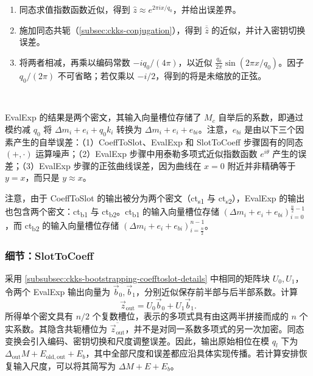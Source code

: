 \begin{enumerate}
\item 同态求值指数函数近似，得到 $\widehat z\approx e^{2\pi ix/q_0}$，并给出误差界。

\item 施加同态共轭（\autoref{subsec:ckks-conjugation}），得到 $\overline{\widehat z}$ 的近似，并计入密钥切换误差。

\item 将两者相减，再乘以编码常数 $-iq_0/(4\pi)$，以近似 $\frac{q_0}{2\pi}\sin(2\pi x/q_0)$。因子 $q_0/(2\pi)$ 不可省略；若仅乘以 $-i/2$，得到的将是未缩放的正弦。
\end{enumerate}

$ $

\textsf{EvalExp} 的结果是两个密文，其输入向量槽位存储了 $M_c$ 自举后的系数，即通过模约减 $q_0$ 将 $\Delta m_i + e_i + q_0k_i$ 转换为 $\Delta m_i + e_i + e_{bi}$。注意，$e_{bi}$ 是由以下三个因素产生的自举误差：（1）\textsf{CoeffToSlot}、\textsf{EvalExp} 和 \textsf{SlotToCoeff} 步骤固有的同态 $(+, \cdot)$ 运算噪声；（2）\textsf{EvalExp} 步骤中用泰勒多项式近似指数函数 $e^{i\theta}$ 产生的误差；（3）\textsf{EvalExp} 步骤的正弦曲线误差，因为曲线在 $x=0$ 附近并非精确等于 $y=x$，而只是 $y \approx x$。

注意，由于 \textsf{CoeffToSlot} 的输出被分为两个密文（\textsf{ct\textsubscript{s1}} 与 \textsf{ct\textsubscript{s2}}），\textsf{EvalExp} 的输出也包含两个密文：\textsf{ct\textsubscript{b1}} 与 \textsf{ct\textsubscript{b2}}。\textsf{ct\textsubscript{b1}} 的输入向量槽位存储 $(\Delta m_i + e_i + e_{bi})_{i=0}^{\frac{n}{2} - 1}$，而 \textsf{ct\textsubscript{b2}} 的输入向量槽位存储 $(\Delta m_i + e_i + e_{bi})_{i=\frac{n}{2}}^{n - 1}$。


\subsubsection{细节：\textsf{SlotToCoeff}}
\label{subsubsec:ckks-bootstrapping-slottocoeff-details}

采用 \autoref{subsubsec:ckks-bootstrapping-coefftoslot-details} 中相同的矩阵块 $U_0,U_1$，令两个 EvalExp 输出向量为 $\vec b_0,\vec b_1$，分别近似保存前半部与后半部系数。计算
\[
\vec z_{\mathrm{out}}=U_0\vec b_0+U_1\vec b_1.
\]
所得单个密文具有 $n/2$ 个复数槽位，表示的多项式具有由这两半拼接而成的 $n$ 个实系数。其隐含共轭槽位为 $\overline{\vec z_{\mathrm{out}}}$，并不是对同一系数多项式的另一次加密。同态变换会引入编码、密钥切换和尺度调整误差。因此，输出原始相位在模 $q_l$ 下为 $\Delta_{\mathrm{out}}M+E_{\mathrm{old,out}}+E_b$，其中全部尺度和误差都应沿具体实现传播。若计算安排恢复输入尺度，可以将其简写为 $\Delta M+E+E_b$。

